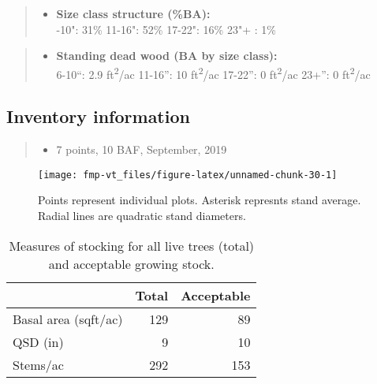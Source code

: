 \documentclass[]{tufte-handout}
\providecommand{\tightlist}{%
  \setlength{\itemsep}{0pt}\setlength{\parskip}{0pt}}
\begin{document}
\begin{quote}
\begin{itemize}
\tightlist
\item
  \textbf{Size class structure (\%BA):}\\
  \vspace{2pt} -10": 31\% \textbar{} 11-16": 52\% \textbar{}
  17-22": 16\% \textbar{} 23"+ : 1\%
\end{itemize}
\end{quote}

\begin{quote}
\begin{itemize}
\tightlist
\item
  \textbf{Standing dead wood (BA by size class):}\\
  \vspace{2pt} \indent \small 6-10``: 2.9 ft\textsuperscript{2}/ac
  \textbar{} 11-16'': 10 ft\textsuperscript{2}/ac \textbar{} 17-22'': 0
  ft\textsuperscript{2}/ac \textbar{} 23+'': 0 ft\textsuperscript{2}/ac
\end{itemize}
\end{quote}

\subsection{Inventory information}\label{inventory-information-5}

\begin{quote}
\begin{itemize}
\tightlist
\item
  7 points, 10 BAF, September, 2019
\end{itemize}
\end{quote}

\begin{figure}
\texttt{[image: fmp-vt\_files/figure-latex/unnamed-chunk-30-1]} \caption[Points represent individual plots]{Points represent individual plots. Asterisk represnts stand average. Radial lines are quadratic stand diameters.}\label{fig:unnamed-chunk-30}
\end{figure}

\begin{table}

\caption{\label{tab:unnamed-chunk-31}Measures of stocking for all live trees (total) and acceptable growing stock.}
\centering
\begin{tabular}[t]{lrr}
\toprule
  & Total & Acceptable\\
\midrule
Basal area (sqft/ac) & 129 & 89\\
QSD (in) & 9 & 10\\
Stems/ac & 292 & 153\\
\bottomrule
\end{tabular}
\end{table}
\end{document}
